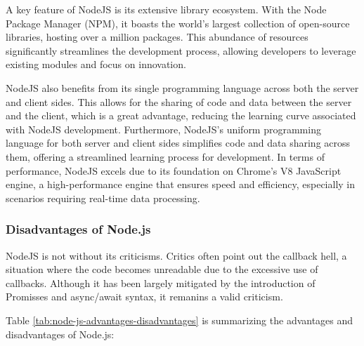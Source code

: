 A key feature of NodeJS is its extensive library ecosystem. With the Node Package Manager (NPM), it boasts the world's largest collection of open-source libraries, hosting over a million packages.\cite{npm} This abundance of resources significantly streamlines the development process, allowing developers to leverage existing modules and focus on innovation.

NodeJS also benefits from its single programming language across both the server and client sides. This allows for the sharing of code and data between the server and the client, which is a great advantage, reducing the learning curve associated with NodeJS development. \cite{tilkov}
Furthermore, NodeJS's uniform programming language for both server and client sides simplifies code and data sharing across them, offering a streamlined learning process for development. In terms of performance, NodeJS excels due to its foundation on Chrome's V8 JavaScript engine, a high-performance engine that ensures speed and efficiency, especially in scenarios requiring real-time data processing. \cite{tilkov}

\subsubsection*{Disadvantages of Node.js}
NodeJS is not without its criticisms. Critics often point out the callback hell, a situation where the code becomes unreadable due to the excessive use of callbacks. Although it has been largely mitigated by the introduction of Promisses and async/await syntax, it remanins a valid criticism. \cite{cantelon2014node}

Table \ref{tab:node-js-advantages-disadvantages} is summarizing the advantages and disadvantages of Node.js\cite{tilkov}:

